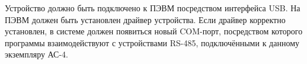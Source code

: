 Устройство должно быть подключено к ПЭВМ посредством интерфейса USB. На ПЭВМ должен быть установлен драйвер устройства. Если драйвер корректно установлен, в системе должен появиться новый COM-порт, посредством которого программы взаимодействуют с устройствами RS-485, подключёнными к данному экземпляру АС-4.